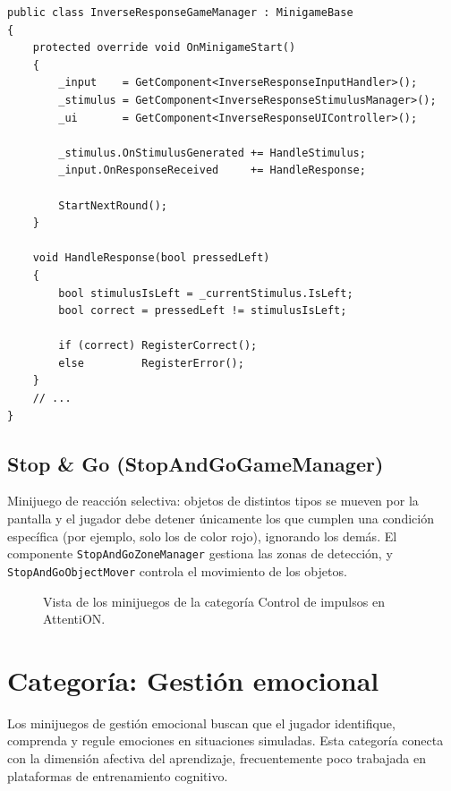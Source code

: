 \documentclass[12pt, a4paper]{report}
\begin{document}
\begin{lstlisting}[caption={InverseResponseGameManager.cs — Mecánica de respuesta inversa},
                   label={lst:inverse}]
public class InverseResponseGameManager : MinigameBase
{
    protected override void OnMinigameStart()
    {
        _input    = GetComponent<InverseResponseInputHandler>();
        _stimulus = GetComponent<InverseResponseStimulusManager>();
        _ui       = GetComponent<InverseResponseUIController>();

        _stimulus.OnStimulusGenerated += HandleStimulus;
        _input.OnResponseReceived     += HandleResponse;

        StartNextRound();
    }

    void HandleResponse(bool pressedLeft)
    {
        bool stimulusIsLeft = _currentStimulus.IsLeft;
        bool correct = pressedLeft != stimulusIsLeft;

        if (correct) RegisterCorrect();
        else         RegisterError();
    }
    // ...
}
\end{lstlisting}

\subsection{Stop \& Go (StopAndGoGameManager)}

Minijuego de reacción selectiva: objetos de distintos tipos se mueven por la
pantalla y el jugador debe detener únicamente los que cumplen una condición
específica (por ejemplo, solo los de color rojo), ignorando los demás. El
componente \texttt{StopAndGoZoneManager} gestiona las zonas de detección, y
\texttt{StopAndGoObjectMover} controla el movimiento de los objetos.

\begin{figure}[H]
  \centering
  \caption{Vista de los minijuegos de la categoría Control de impulsos en AttentiON.}
  \label{fig:impulsos}
\end{figure}

\section{Categoría: Gestión emocional}

Los minijuegos de gestión emocional buscan que el jugador identifique,
comprenda y regule emociones en situaciones simuladas. Esta categoría conecta
con la dimensión afectiva del aprendizaje, frecuentemente poco trabajada en
plataformas de entrenamiento cognitivo.
\end{document}
